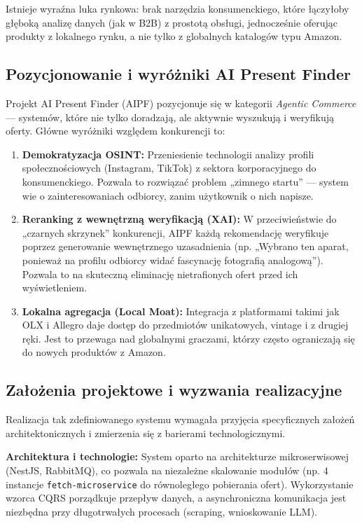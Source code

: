 \documentclass[polish,edition=2025]{zpiday}
\begin{document}
Istnieje wyraźna luka rynkowa: brak narzędzia konsumenckiego, które łączyłoby głęboką analizę danych (jak w B2B) z prostotą obsługi, jednocześnie oferując produkty z lokalnego rynku, a nie tylko z globalnych katalogów typu Amazon.

\subsection{Pozycjonowanie i wyróżniki AI Present Finder}

Projekt AI Present Finder (AIPF) pozycjonuje się w kategorii \textit{Agentic Commerce} — systemów, które nie tylko doradzają, ale aktywnie wyszukują i weryfikują oferty. Główne wyróżniki względem konkurencji to:

\begin{enumerate}
    \item \textbf{Demokratyzacja OSINT:} Przeniesienie technologii analizy profili społecznościowych (Instagram, TikTok) z sektora korporacyjnego do konsumenckiego. Pozwala to rozwiązać problem „zimnego startu” — system wie o zainteresowaniach odbiorcy, zanim użytkownik o nich napisze.
    \item \textbf{Reranking z wewnętrzną weryfikacją (XAI):} W przeciwieństwie do „czarnych skrzynek” konkurencji, AIPF każdą rekomendację weryfikuje poprzez generowanie wewnętrznego uzasadnienia (np. „Wybrano ten aparat, ponieważ na profilu odbiorcy widać fascynację fotografią analogową”). Pozwala to na skuteczną eliminację nietrafionych ofert przed ich wyświetleniem.
    \item \textbf{Lokalna agregacja (Local Moat):} Integracja z platformami takimi jak OLX i Allegro daje dostęp do przedmiotów unikatowych, vintage i z drugiej ręki. Jest to przewaga nad globalnymi graczami, którzy często ograniczają się do nowych produktów z Amazon.
\end{enumerate}

\subsection{Założenia projektowe i wyzwania realizacyjne}

Realizacja tak zdefiniowanego systemu wymagała przyjęcia specyficznych założeń architektonicznych i zmierzenia się z barierami technologicznymi.

\textbf{Architektura i technologie:}
System oparto na architekturze mikroserwisowej (NestJS, RabbitMQ), co pozwala na niezależne skalowanie modułów (np. 4 instancje \texttt{fetch-microservice} do równoległego pobierania ofert). Wykorzystanie wzorca CQRS porządkuje przepływ danych, a asynchroniczna komunikacja jest niezbędna przy długotrwałych procesach (scraping, wnioskowanie LLM).
\end{document}
